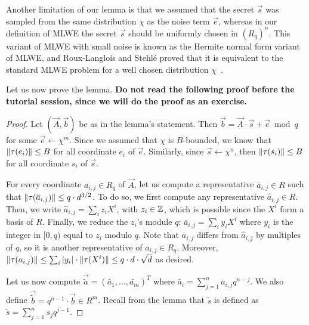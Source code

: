 Another limitation of our lemma is that we assumed that the secret $\vec s$ was sampled from the same distribution $\chi$ as the noise term $\vec e$, whereas in our definition of MLWE the secret $\vec s$ should be uniformly chosen in $(R_q)^n$. This variant of MLWE with small noise is known as the Hermite normal form variant of MLWE, and Roux-Langlois and Stehlé proved that it is equivalent to the standard MLWE problem for a well chosen distribution $\chi$~\cite[Le. 4.24]{MLWE2}.

Let us now prove the lemma. \textbf{Do not read the following proof before the tutorial session, since we will do the proof as an exercise.}

\begin{proof}
Let $(\vec A, \vec b)$ be as in the lemma's statement. Then $\vec b = \vec A \cdot \vec s + \vec e \bmod q$ for some $\vec e \leftarrow \chi^m$. Since we assumed that $\chi$ is $B$-bounded, we know that $\|\tau(e_i)\| \leq B$ for all coordinate $e_i$ of $\vec e$. Similarly, since $\vec s \leftarrow \chi^n$, then $\|\tau(s_i)\| \leq B$ for all coordinate $s_i$ of $\vec s$.

For every coordinate $a_{i,j} \in R_q$ of $\vec A$, let us compute a representative $\overline{a}_{i,j} \in R$ such that $\|\tau(\overline{a}_{i,j}) \| \leq q \cdot d^{3/2}$. To do so, we first compute any representative $\hat{a}_{i,j} \in R$. Then, we write $\hat{a}_{i,j} = \sum_i z_i X^i$, with $z_i \in \mathbb{Z}$, which is possible since the $X^i$ form a basis of $R$. Finally, we reduce the $z_i$'s module $q$: $\overline{a}_{i,j} = \sum_i y_i X^i$ where $y_i$ is the integer in $[0,q)$ equal to $z_i$ modulo $q$. Note that $\overline{a}_{i,j}$ differs from $\hat{a}_{i,j}$ by multiples of $q$, so it is another representative of $a_{i,j} \in R_q$. Moreover, $\|\tau(a_{i,j})\| \leq \sum_i |y_i| \cdot \|\tau(X^i)\| \leq q \cdot d \cdot \sqrt{d}$ as desired.

Let us now compute $\vec{\tilde{a}} = (\tilde{a_1}, \dots, \tilde{a_m})^T$ where $\tilde{a_i} = \sum_{j = 1}^n \overline{a}_{i,j} q^{n-j}$. 
We also define $\vec{\tilde{b}} = q^{n-1} \cdot \vec b \in R^m$.
Recall from the lemma that $\tilde{s}$ is defined as $\tilde{s} = \sum_{j=1}^n s_j q^{j-1}$.


\end{proof}

